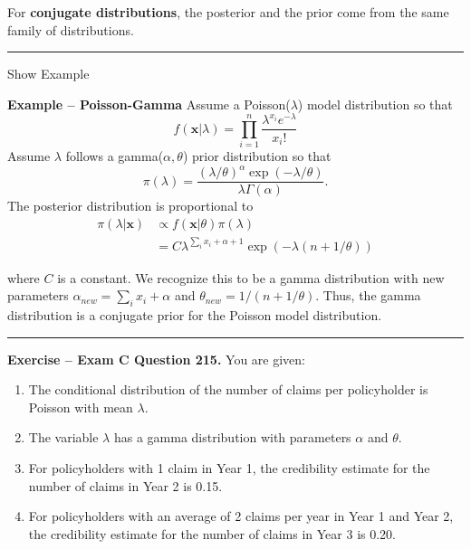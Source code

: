 \documentclass[]{book}
\providecommand{\tightlist}{%
  \setlength{\itemsep}{0pt}\setlength{\parskip}{0pt}}
\theoremstyle{definition}
\theoremstyle{definition}
\theoremstyle{definition}
\theoremstyle{remark}
\begin{document}
For \textbf{conjugate distributions}, the posterior and the prior come
from the same family of distributions.

\begin{center}\rule{0.5\linewidth}{\linethickness}\end{center}

Show Example

\hypertarget{toggleExampleConj}{}
\textbf{Example -- Poisson-Gamma} Assume a Poisson(\(\lambda\)) model
distribution so that
\[f(\mathbf{x} | \lambda) = \prod_{i=1}^n \frac{\lambda^{x_i} e^{-\lambda}}{x_i!}\]
Assume \(\lambda\) follows a gamma(\(\alpha, \theta\)) prior
distribution so that
\[\pi(\lambda) = \frac{\left(\lambda/\theta\right)^{\alpha} \exp(-\lambda/\theta)}{\lambda \Gamma(\alpha)}.\]
The posterior distribution is proportional to \[\begin{aligned}
\pi(\lambda | \mathbf{x}) &\propto f(\mathbf{x}|\theta ) \pi(\lambda) \\
&= C \lambda^{\sum_i x_i + \alpha +1} \exp(-\lambda(n+1/\theta))
\end{aligned}\]

where \(C\) is a constant. We recognize this to be a gamma distribution
with new parameters \(\alpha_{new} = \sum_i x_i + \alpha\) and
\(\theta_{new} = 1/(n + 1/\theta)\). Thus, the gamma distribution is a
conjugate prior for the Poisson model distribution.

\begin{center}\rule{0.5\linewidth}{\linethickness}\end{center}

\textbf{Exercise -- Exam C Question 215.} You are given:

\begin{enumerate}
\def\labelenumi{(\roman{enumi})}
\tightlist
\item
  The conditional distribution of the number of claims per policyholder
  is Poisson with mean \(\lambda\).
\item
  The variable \(\lambda\) has a gamma distribution with parameters
  \(\alpha\) and \(\theta\).
\item
  For policyholders with 1 claim in Year 1, the credibility estimate for
  the number of claims in Year 2 is 0.15.
\item
  For policyholders with an average of 2 claims per year in Year 1 and
  Year 2, the credibility estimate for the number of claims in Year 3 is
  0.20.
\end{enumerate}
\end{document}
